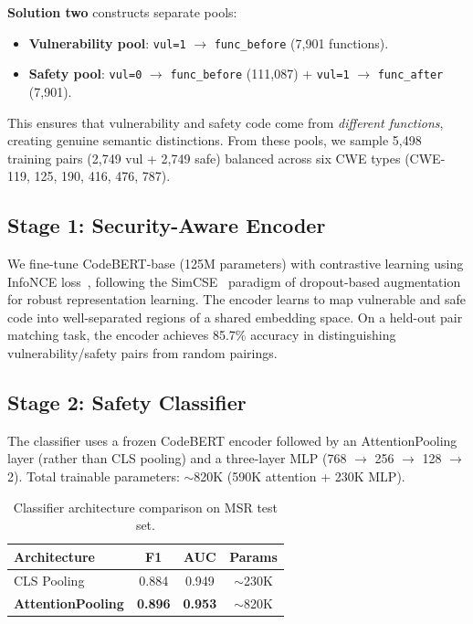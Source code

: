 \documentclass[10pt,conference]{IEEEtran}
\begin{document}
\textbf{Solution two} constructs separate pools:
\begin{itemize}
\item \textbf{Vulnerability pool}: \texttt{vul=1} $\rightarrow$ \texttt{func\_before} (7,901 functions).
\item \textbf{Safety pool}: \texttt{vul=0} $\rightarrow$ \texttt{func\_before} (111,087) + \texttt{vul=1} $\rightarrow$ \texttt{func\_after} (7,901).
\end{itemize}
This ensures that vulnerability and safety code come from \textit{different functions}, creating genuine semantic distinctions. From these pools, we sample 5,498 training pairs (2,749 vul + 2,749 safe) balanced across six CWE types (CWE-119, 125, 190, 416, 476, 787).

\subsection{Stage 1: Security-Aware Encoder}

We fine-tune CodeBERT-base (125M parameters) with contrastive learning using InfoNCE loss~\cite{infonce}, following the SimCSE~\cite{simcse} paradigm of dropout-based augmentation for robust representation learning. The encoder learns to map vulnerable and safe code into well-separated regions of a shared embedding space. On a held-out pair matching task, the encoder achieves 85.7\% accuracy in distinguishing vulnerability/safety pairs from random pairings.

\subsection{Stage 2: Safety Classifier}

The classifier uses a frozen CodeBERT encoder followed by an AttentionPooling layer (rather than CLS pooling) and a three-layer MLP (768 $\rightarrow$ 256 $\rightarrow$ 128 $\rightarrow$ 2). Total trainable parameters: $\sim$820K (590K attention + 230K MLP).

\begin{table}[h]
\centering
\caption{Classifier architecture comparison on MSR test set.}
\begin{tabular}{lccc}
\toprule
Architecture & F1 & AUC & Params \\
\midrule
CLS Pooling & 0.884 & 0.949 & $\sim$230K \\
\textbf{AttentionPooling} & \textbf{0.896} & \textbf{0.953} & $\sim$820K \\
\bottomrule
\end{tabular}
\end{table}
\end{document}
